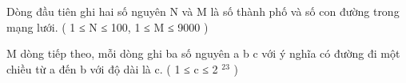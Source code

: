Dòng đầu tiên ghi hai số nguyên N và M là số thành phố và số con đường trong mạng lưới. ( 1 ≤ N ≤ 100,  1 ≤ M ≤ 9000 )  

   M dòng tiếp theo, mỗi dòng ghi ba số nguyên a b c với ý nghĩa có đường đi một chiều từ a đến b với độ dài là c. ( 1 ≤ c ≤ 2   $^    23   $   )  

\